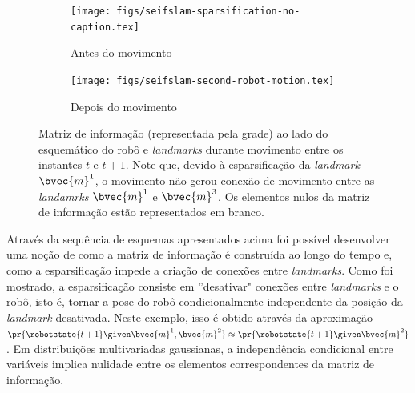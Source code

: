 \begin{figure}[h]
  \begin{subfigure}{0.475\textwidth}
    \texttt{[image: figs/seifslam-sparsification-no-caption.tex]}
    \caption{Antes do movimento}
  \end{subfigure}
  \hfill
  \begin{subfigure}{0.475\textwidth}
    \texttt{[image: figs/seifslam-second-robot-motion.tex]} 
    \caption{Depois do movimento}
    \label{fig:seifslam-info-matrix-construction-second-motion-b}
  \end{subfigure}
  \caption{Matriz de informação (representada pela grade) ao lado do esquemático do robô e \textit{landmarks} durante movimento entre os instantes $t$ e $t+1$. Note que, devido à esparsificação da \textit{landmark} $\bvec{m}^1$, o movimento não gerou conexão de movimento entre as \textit{landamrks} $\bvec{m}^1$ e $\bvec{m}^3$. Os elementos nulos da matriz de informação estão representados em branco.}
  \label{fig:seifslam-info-matrix-construction-second-motion}
\end{figure}

Através da sequência de esquemas apresentados acima foi possível 
desenvolver uma noção de como a matriz de informação é construída 
ao longo do tempo e, como a esparsificação impede a criação de 
conexões entre \textit{landmarks}. Como foi mostrado, a 
esparsificação consiste em ''desativar" conexões entre \textit{landmarks} e o robô, isto é, tornar a pose do robô 
condicionalmente independente da posição da \textit{landmark} 
desativada. Neste exemplo, isso é obtido através da aproximação 
$\pr{\robotstate{t+1} \given \bvec{m}^1, \bvec{m}^2} \approx \pr{\robotstate{t+1} \given \bvec{m}^2}$. Em distribuições multivariadas gaussianas, a independência condicional entre 
variáveis implica nulidade entre os elementos correspondentes da matriz de informação.


